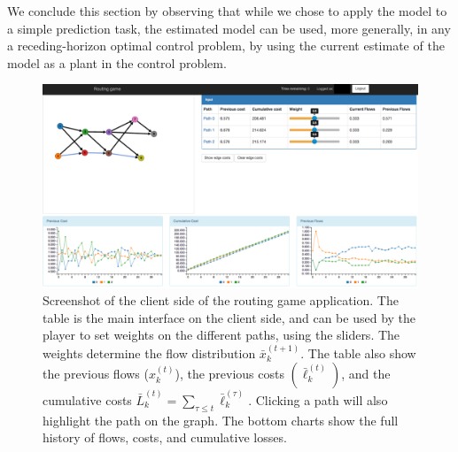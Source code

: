 \documentclass{sig-alternate-ipsn13}
\begin{document}
We conclude this section by observing that while we chose to apply the model to a simple prediction task, the estimated model can be used, more generally, in any a receding-horizon optimal control problem, by using the current estimate of the model as a plant in the control problem.
\begin{figure}
\centering
\includegraphics[width=.72\textwidth]{images/user_interface.pdf}\hspace{.03\textwidth}%
\caption{\footnotesize Screenshot of the client side of the routing game application. The table is the main interface on the client side, and can be used by the player to set weights on the different paths, using the sliders. The weights determine the flow distribution $\bar x^{(t+1)}_k$. The table also show the previous flows ($x^{(t)}_k$), the previous costs $(\bar \ell^{(t)}_k)$, and the cumulative costs $\bar L^{(t)}_k = \sum_{\tau \leq t} \bar \ell^{(\tau)}_k$. Clicking a path will also highlight the path on the graph. The bottom charts show the full history of flows, costs, and cumulative losses.}
\label{fig:game_interface}  
\end{figure}
\end{document}
